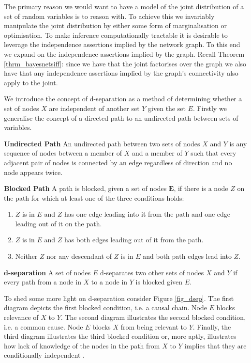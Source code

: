 The primary reason we would want to have a model of the joint distribution of a set of random variables is to reason with. To achieve this we invariably manipulate the joint distribution by either some form of marginalisation or optimisation. To make inference computationally tractable it is desirable to leverage the independence assertions implied by the network graph. To this end we expand on the independence assertions implied by the graph. Recall Theorem \ref{thrm_bayesnetsiff}: since we have that the joint factorises over the graph we also have that any independence assertions implied by the graph's connectivity also apply to the joint.

We introduce the concept of d-separation as a method of determining whether a set of nodes $X$ are independent of another set $Y$ given the set $E$. Firstly we generalise the concept of a directed path to an undirected path between sets of variables.
\begin{defn}
\textbf{Undirected Path} An undirected path between two sets of nodes $X$ and $Y$ is any sequence of nodes between a member of $X$ and a member of $Y$ such that every adjacent pair of nodes is connected by an edge regardless of direction and no node appears twice.
\end{defn}
\begin{defn}
\textbf{Blocked Path} A path is blocked, given a set of nodes $\mathbf{E}$, if there is a node $Z$ on the path for which at least one of the three conditions holds:
\begin{enumerate}
\item
$Z$ is in $E$ and $Z$ has one edge leading into it from the path and one edge leading out of it on the path.
\item
$Z$ is in $E$ and $Z$ has both edges leading out of it from the path.
\item
Neither $Z$ nor any descendant of $Z$ is in $E$ and both path edges lead into $Z$.
\end{enumerate}
\end{defn}
\begin{defn}
\textbf{d-separation} A set of nodes $E$ d-separates two other sets of nodes $X$ and $Y$ if every path from a node in $X$ to a node in $Y$ is blocked given $E$.
\end{defn}
To shed some more light on d-separation consider Figure \ref{fig_dsep}. The first diagram depicts the first blocked condition, i.e. a causal chain. Node $E$ blocks relevance of $X$ to $Y$. The second diagram illustrates the second blocked condition, i.e. a common cause. Node $E$ blocks $X$ from being relevant to $Y$. Finally, the third diagram illustrates the third blocked condition or, more aptly, illustrates how lack of knowledge of the nodes in the path from $X$ to $Y$ implies that they are conditionally independent \cite{korb}.
